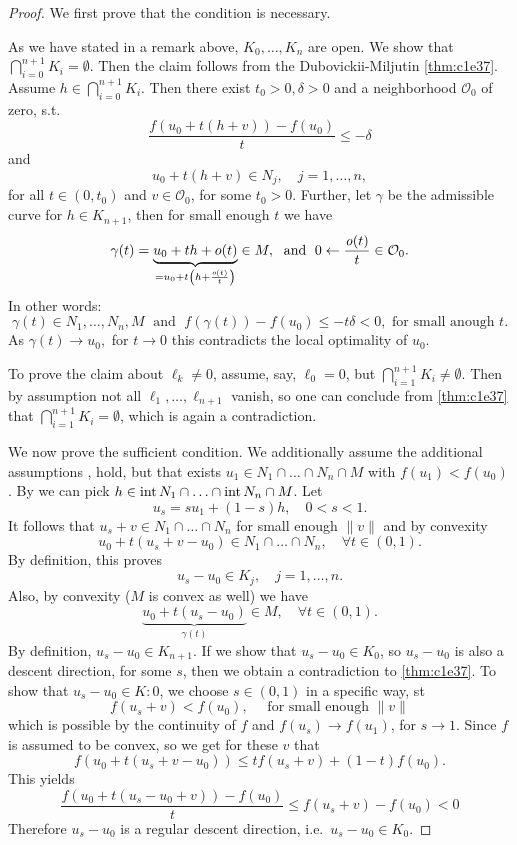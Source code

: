 \documentclass[../skript.tex]{subfiles}
\begin{document}
\begin{proof}
	We first prove that the condition is necessary.\par
	As we have stated in a remark above, $K_0,\ldots,K_n$ are open. We show that $\bigcap_{i=0}^{n+1}K_i=\emptyset$. Then the claim follows from the Dubovickii-Miljutin \cref{thm:c1e37}. Assume $h\in\bigcap_{i=0}^{n+1}K_i$. Then there exist $t_0>0,\delta>0$ and a neighborhood $\mathcal{O}_0$ of zero, s.t.
	\[
		\frac{f(u_0+  t(h+v)) - f(u_0)}{t}\leq -\delta 
	\]
	and
	\[
		u_0 + t(h+v)\in N_j,\quad j=1,\ldots,n,
	\]
	for all $t\in(0,t_0)$ and $v\in\mathcal{O}_0$, for some $t_0 > 0$. Further, let $\gamma$ be the admissible curve for $h\in K_{n+1}$, then for small enough $t$ we have
	\[
		\gamma(t) = \underbrace{u_0 + th + o(t)}_{=u_0 + t\left(h+\frac{\mathit{o}(t)}{t}\right)}\in M, \; \text{ and } \; 0\leftarrow\frac{\mathit{o}(t)}{t}\in\mathcal{O}_0.
	\]
	In other words:
	\[
		\gamma(t)\in N_1,\ldots,N_n,M\;\text{ and }\;f(\gamma(t)) - f(u_0) \leq -t\delta < 0,\text{ for small anough }t.
	\]
	As $\gamma(t)\to u_0,$ for $t\to 0$ this contradicts the local optimality of $u_0$.\par
	To prove the claim about $\ell_k\not=0$, assume, say, $\ell_0 = 0$, but $\bigcap_{i=1}^{n+1}K_i\not=\emptyset$. Then by assumption not all $\ell_1,\ldots,\ell_{n+1}$ vanish, so one can conclude from \cref{thm:c1e37} that $\bigcap_{i=1}^{n+1}K_i = \emptyset$, which is again a contradiction.\par
	We now prove the sufficient condition. We additionally assume the additional assumptions ,  hold, but that exists $u_1\in N_1\cap\ldots\cap N_n\cap M$ with $f(u_1)<f(u_0)$. By  we can pick $h\in \operatorname{int} N_1 \cap\ldots\cap \operatorname{int} N_n\cap M$. Let
	\[
		u_s = su_1 + (1-s)h,\quad 0<s<1.
	\]
	It follows that $u_s+v\in N_1\cap\ldots\cap N_n$ for small enough $\|v\|$ and by convexity
	\[
		u_0 + t(u_s+v-u_0)\in N_1\cap\ldots\cap N_n,\quad\forall t\in (0,1).
	\]
	By definition, this proves
	\[
		u_s-u_0\in K_j,\quad j=1,\ldots,n.
	\]
	Also, by convexity ($M$ is convex as well) we have 
	\[
		\underbrace{u_0 + t(u_s-u_0)}_{\gamma(t)}\in M,\quad\forall t\in(0,1).
	\]
	By definition, $u_s-u_0 \in K_{n+1}$. If we show that $u_s-u_0\in K_0$, so $u_s-u_0$ is also a descent direction, for some $s$, then we obtain a contradiction to \cref{thm:c1e37}. To show that $u_s-u_0\in K:0$, we choose $s\in(0,1)$ in a specific way, \ac{st}
	\[
		f(u_s+v) < f(u_0),\quad\text{ for small enough }\|v\|
	\]
	which is possible by the continuity of $f$ and $f(u_s)\to f(u_1)$, for $s\to 1$. Since $f$ is assumed to be convex, so we get for these $v$ that
	\[
		f(u_0+t(u_s+v-u_0)) \leq t f(u_s+v) + (1-t) f(u_0).
	\]
	This yields
	\[
		\frac{f(u_0+t(u_s-u_0+v))-f(u_0)}{t}\leq f(u_s+v)-f(u_0) < 0
	\]
	Therefore $u_s-u_0$ is a regular descent direction, i.e.\ $u_s-u_0\in K_0$.
\end{proof}
\end{document}
